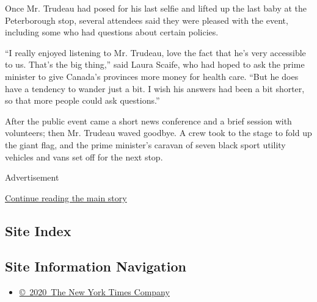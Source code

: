 Once Mr. Trudeau had posed for his last selfie and lifted up the last
baby at the Peterborough stop, several attendees said they were pleased
with the event, including some who had questions about certain policies.

``I really enjoyed listening to Mr. Trudeau, love the fact that he's
very accessible to us. That's the big thing,'' said Laura Scaife, who
had hoped to ask the prime minister to give Canada's provinces more
money for health care. ``But he does have a tendency to wander just a
bit. I wish his answers had been a bit shorter, so that more people
could ask questions.''

After the public event came a short news conference and a brief session
with volunteers; then Mr. Trudeau waved goodbye. A crew took to the
stage to fold up the giant flag, and the prime minister's caravan of
seven black sport utility vehicles and vans set off for the next stop.

Advertisement

\protect\hyperlink{after-bottom}{Continue reading the main story}

\hypertarget{site-index}{%
\subsection{Site Index}\label{site-index}}

\hypertarget{site-information-navigation}{%
\subsection{Site Information
Navigation}\label{site-information-navigation}}

\begin{itemize}
\tightlist
\item
  \href{https://help.nytimes.com/hc/en-us/articles/115014792127-Copyright-notice}{©~2020~The
  New York Times Company}
\end{itemize}

